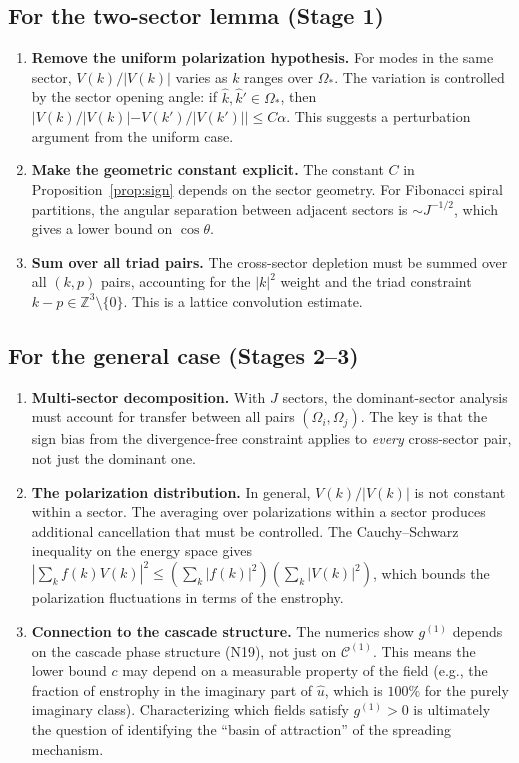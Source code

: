 \documentclass[11pt]{article}
\theoremstyle{definition}
\newcommand{\Z}{\mathbb{Z}}
\newcommand{\cC}{\mathcal{C}}
\begin{document}
\subsection{For the two-sector lemma (Stage 1)}

\begin{enumerate}
\item \textbf{Remove the uniform polarization
  hypothesis.}  For modes in the same sector,
  $V(k)/|V(k)|$ varies as $k$ ranges over
  $\Omega_*$.  The variation is controlled by
  the sector opening angle: if
  $\hat k, \hat k'\in\Omega_*$, then
  $|V(k)/|V(k)| - V(k')/|V(k')||
  \leq C\alpha$.  This suggests a perturbation
  argument from the uniform case.

\item \textbf{Make the geometric constant
  explicit.}  The constant $C$ in
  Proposition~\ref{prop:sign} depends on the
  sector geometry.  For Fibonacci spiral
  partitions, the angular separation between
  adjacent sectors is $\sim J^{-1/2}$, which
  gives a lower bound on $\cos\theta$.

\item \textbf{Sum over all triad pairs.}
  The cross-sector depletion must be summed
  over all $(k,p)$ pairs, accounting for the
  $|k|^2$ weight and the triad constraint
  $k-p\in\Z^3\setminus\{0\}$.  This is a
  lattice convolution estimate.
\end{enumerate}

\subsection{For the general case (Stages 2--3)}

\begin{enumerate}
\item \textbf{Multi-sector decomposition.}
  With $J$ sectors, the dominant-sector
  analysis must account for transfer between
  all pairs $(\Omega_i, \Omega_j)$.  The key
  is that the sign bias from the divergence-free
  constraint applies to \emph{every}
  cross-sector pair, not just the dominant one.

\item \textbf{The polarization distribution.}
  In general, $V(k)/|V(k)|$ is not constant
  within a sector.  The averaging over
  polarizations within a sector produces
  additional cancellation that must be
  controlled.  The Cauchy--Schwarz inequality
  on the energy space gives
  $|\sum_k f(k)V(k)|^2 \leq
  (\sum_k|f(k)|^2)(\sum_k|V(k)|^2)$,
  which bounds the polarization fluctuations
  in terms of the enstrophy.

\item \textbf{Connection to the cascade
  structure.}  The numerics show $g^{(1)}$
  depends on the cascade phase structure
  (N19), not just on $\cC^{(1)}$.  This means
  the lower bound $c$ may depend on a
  measurable property of the field (e.g.,
  the fraction of enstrophy in the imaginary
  part of $\hat u$, which is $100\%$ for the
  purely imaginary class).  Characterizing
  which fields satisfy $g^{(1)}>0$ is
  ultimately the question of identifying the
  ``basin of attraction'' of the spreading
  mechanism.
\end{enumerate}
\end{document}
